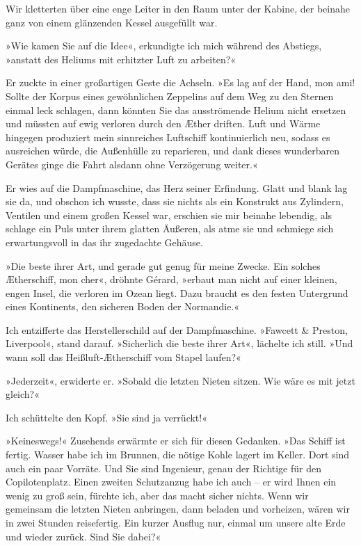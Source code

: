 Wir kletterten über eine enge Leiter in den Raum unter der Kabine,
der beinahe ganz von einem glänzenden Kessel ausgefüllt war.

»Wie kamen Sie auf die Idee«, erkundigte ich mich während des
Abstiegs, »anstatt des Heliums mit erhitzter Luft zu arbeiten?«

Er zuckte in einer großartigen Geste die Achseln. »Es lag auf der
Hand, mon ami! Sollte der Korpus eines gewöhnlichen Zeppelins auf
dem Weg zu den Sternen einmal leck schlagen, dann könnten Sie das
ausströmende Helium nicht ersetzen und müssten auf ewig verloren
durch den Æther driften. Luft und Wärme hingegen produziert mein
sinnreiches Luftschiff kontinuierlich neu, sodass es ausreichen
würde, die Außenhülle zu reparieren, und dank dieses wunderbaren
Gerätes ginge die Fahrt alsdann ohne Verzögerung weiter.«

Er wies auf die Dampfmaschine, das Herz seiner Erfindung. Glatt und
blank lag sie da, und obschon ich wusste, dass sie nichts als ein
Konstrukt aus Zylindern, Ventilen und einem großen Kessel war,
erschien sie mir beinahe lebendig, als schlage ein Puls unter ihrem
glatten Äußeren, als atme sie und schmiege sich erwartungsvoll in
das ihr zugedachte Gehäuse.

»Die beste ihrer Art, und gerade gut genug für meine Zwecke. Ein
solches Ætherschiff, mon cher«, dröhnte Gérard, »erbaut man nicht
auf einer kleinen, engen Insel, die verloren im Ozean liegt. Dazu
braucht es den festen Untergrund eines Kontinents, den sicheren
Boden der Normandie.«

Ich entzifferte das Herstellerschild auf der Dampfmaschine.
»Fawcett \& Preston, Liverpool«, stand darauf. »Sicherlich die
beste ihrer Art«, lächelte ich still. »Und wann soll das
Heißluft-Ætherschiff vom Stapel laufen?«

»Jederzeit«, erwiderte er. »Sobald die letzten Nieten sitzen. Wie
wäre es mit jetzt gleich?«

Ich schüttelte den Kopf. »Sie sind ja verrückt!«

»Keineswegs!« Zusehends erwärmte er sich für diesen Gedanken. »Das
Schiff ist fertig. Wasser habe ich im Brunnen, die nötige Kohle
lagert im Keller. Dort sind auch ein paar Vorräte. Und Sie sind
Ingenieur, genau der Richtige für den Copilotenplatz. Einen zweiten
Schutzanzug habe ich auch – er wird Ihnen ein wenig zu groß sein,
fürchte ich, aber das macht sicher nichts. Wenn wir gemeinsam die
letzten Nieten anbringen, dann beladen und vorheizen, wären wir in
zwei Stunden reisefertig. Ein kurzer Ausflug nur, einmal um unsere
alte Erde und wieder zurück. Sind Sie dabei?«


